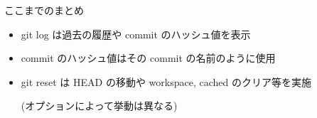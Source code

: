 % 
% 
% 
% 

\begin{frame}[t]{ここまでのまとめ}{}

  \begin{itemize}
  \item git log は過去の履歴や commit のハッシュ値を表示
    \vspace{2ex}

  \item commit のハッシュ値はその commit の名前のように使用
    \vspace{2ex}

  \item git reset は HEAD の移動や workspace, cached のクリア等を実施

    (オプションによって挙動は異なる)
  \end{itemize}

\end{frame}
